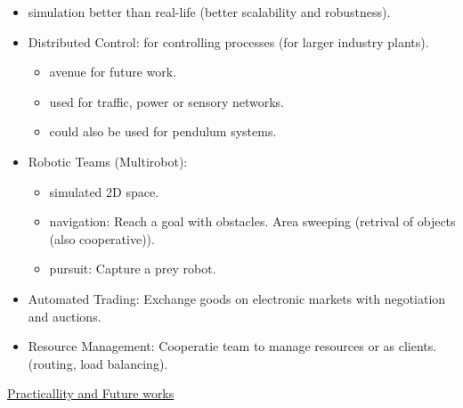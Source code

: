 \begin{itemize}[noitemsep,nolistsep]
	\item simulation better than real-life (better scalability and robustness).
	\item Distributed Control: for controlling processes (for larger industry plants).
	\begin{itemize}[noitemsep,nolistsep]
		\item avenue for future work.
		\item used for traffic, power or sensory networks.
		\item could also be used for pendulum systems.
	\end{itemize}
	\item Robotic Teams (Multirobot):
	\begin{itemize}[noitemsep,nolistsep]
		\item simulated 2D space. 
		\item navigation: Reach a goal with obstacles. Area sweeping (retrival of objects (also cooperative)).
		\item pursuit: Capture a prey robot.
	\end{itemize}
	\item Automated Trading: Exchange goods on electronic markets with negotiation and auctions.
	\item Resource Management: Cooperatie team to manage resources or as clients. (routing, load balancing).
\end{itemize}
\underline{Practicallity and Future works}
